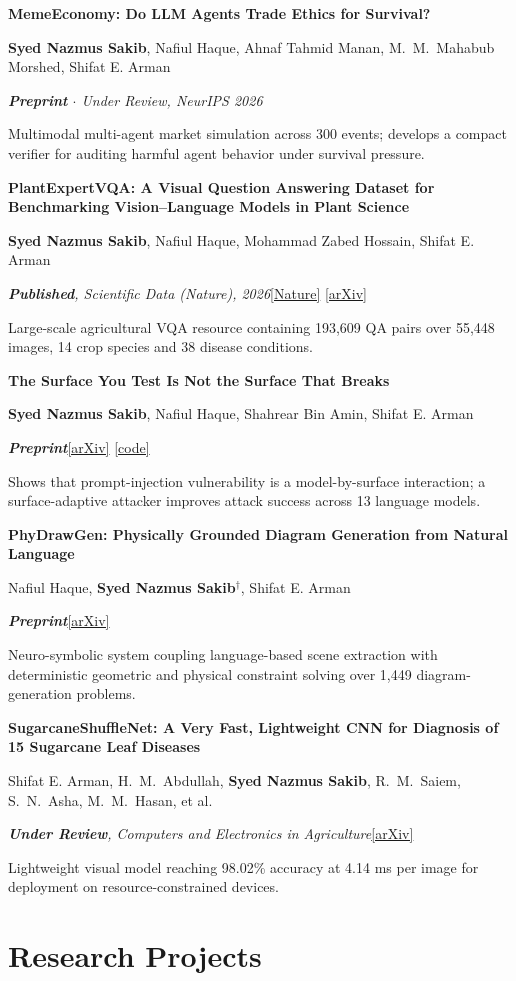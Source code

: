 \documentclass[a4paper,10pt]{article}
\newcommand{\me}{\textbf{Syed Nazmus Sakib}}
\newcommand{\pub}[5]{%
    \noindent\textbf{#1}\par
    {\small\color{descgray}#2}\par
    {\small\itshape #3}\hfill #4\par
    {\small\color{descgray}#5}%
    \addvspace{4pt}
}
\newcommand{\status}[1]{{\color{accent}\bfseries #1}}
\begin{document}
\pub
{MemeEconomy: Do LLM Agents Trade Ethics for Survival?}
{\me, Nafiul Haque, Ahnaf Tahmid Manan, M.~M.~Mahabub Morshed, Shifat E. Arman}
{\status{Preprint} $\cdot$ Under Review, NeurIPS 2026}
{}
{Multimodal multi-agent market simulation across 300 events; develops a compact verifier for auditing harmful agent behavior under survival pressure.}

\pub
{PlantExpertVQA: A Visual Question Answering Dataset for Benchmarking Vision--Language Models in Plant Science}
{\me, Nafiul Haque, Mohammad Zabed Hossain, Shifat E. Arman}
{\status{Published}, Scientific Data (Nature), 2026}
{\href{https://www.nature.com/articles/s41597-026-07779-y}{[Nature]} \href{https://arxiv.org/abs/2508.17117}{[arXiv]}}
{Large-scale agricultural VQA resource containing 193,609 QA pairs over 55,448 images, 14 crop species and 38 disease conditions.}

\pub
{The Surface You Test Is Not the Surface That Breaks}
{\me, Nafiul Haque, Shahrear Bin Amin, Shifat E. Arman}
{\status{Preprint}}
{\href{https://arxiv.org/abs/2605.30454}{[arXiv]} \href{https://github.com/syed-nazmus-sakib/surface-adaptive-injection}{[code]}}
{Shows that prompt-injection vulnerability is a model-by-surface interaction; a surface-adaptive attacker improves attack success across 13 language models.}

\pub
{PhyDrawGen: Physically Grounded Diagram Generation from Natural Language}
{Nafiul Haque, \me$^\dagger$, Shifat E. Arman}
{\status{Preprint}}
{\href{https://arxiv.org/abs/2605.30512}{[arXiv]}}
{Neuro-symbolic system coupling language-based scene extraction with deterministic geometric and physical constraint solving over 1,449 diagram-generation problems.}

\pub
{SugarcaneShuffleNet: A Very Fast, Lightweight CNN for Diagnosis of 15 Sugarcane Leaf Diseases}
{Shifat E. Arman, H.~M.~Abdullah, \me, R.~M.~Saiem, S.~N.~Asha, M.~M.~Hasan, et al.}
{\status{Under Review}, Computers and Electronics in Agriculture}
{\href{https://arxiv.org/abs/2508.17107}{[arXiv]}}
{Lightweight visual model reaching 98.02\% accuracy at 4.14 ms per image for deployment on resource-constrained devices.}


\section*{Research Projects}
\end{document}
